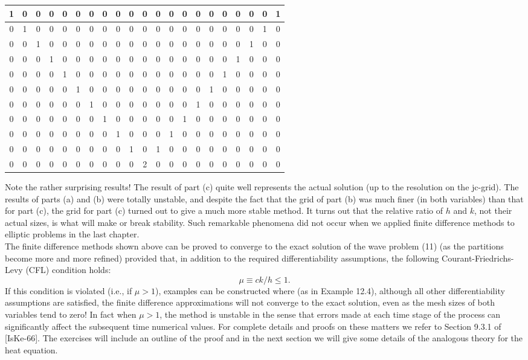 \documentclass[../main.tex]{subfiles}
\begin{document}
\begin{table}[!ht]
    \centering
    \begin{tabular}{|c|c|c|c|c|c|c|c|c|c|c|c|c|c|c|c|c|c|c|c|c|}
    \hline
       1&0&0&0&0&0&0&0&0&0&0&0&0&0&0&0&0&0&0&0&1\\ \hline
       0&1&0&0&0&0&0&0&0&0&0&0&0&0&0&0&0&0&0&1&0\\ \hline
       0&0&1&0&0&0&0&0&0&0&0&0&0&0&0&0&0&0&1&0&0\\ \hline
       0&0&0&1&0&0&0&0&0&0&0&0&0&0&0&0&0&1&0&0&0\\ \hline
       0&0&0&0&1&0&0&0&0&0&0&0&0&0&0&0&1&0&0&0&0\\ \hline
       0&0&0&0&0&1&0&0&0&0&0&0&0&0&0&1&0&0&0&0&0\\ \hline
       0&0&0&0&0&0&1&0&0&0&0&0&0&0&1&0&0&0&0&0&0\\ \hline
       0&0&0&0&0&0&0&1&0&0&0&0&0&1&0&0&0&0&0&0&0\\ \hline
       0&0&0&0&0&0&0&0&1&0&0&0&1&0&0&0&0&0&0&0&0\\ \hline
       0&0&0&0&0&0&0&0&0&1&0&1&0&0&0&0&0&0&0&0&0\\ \hline
       0&0&0&0&0&0&0&0&0&0&2&0&0&0&0&0&0&0&0&0&0\\ \hline
    \end{tabular}
\end{table}
Note the rather surprising results! The result of part (c) quite well represents the actual solution (up to the resolution on the jc-grid). The results of parts (a) and (b) were totally unstable, and despite the fact that the grid of part (b) was much finer (in both variables) than that for part (c), the grid for part (c) turned out to give a much more stable method. It turns out that the relative ratio of $h$ and $k$, not their actual sizes, is what will make or break stability. Such remarkable phenomena did not occur when we applied finite difference methods to elliptic problems in the last chapter. 
\\

The finite difference methods shown above can be proved to converge to the 
exact solution of the wave problem (11) (as the partitions become more and more 
refined) provided that, in addition to the required differentiability assumptions, 
the following Courant-Friedrichs-Levy (CFL) condition holds: 
\begin{equation}
	\mu \equiv ck/h\leqslant1.
\end{equation}
If this condition is violated (i.e., if $\mu > 1$), examples can be constructed where (as in Example 12.4), although all other differentiability assumptions are satisfied, the finite difference approximations will not converge to the exact solution, even as the mesh sizes of both variables tend to zero! In fact when $\mu > 1$, the method is unstable in the sense that errors made at each time stage of the process can significantly affect the subsequent time numerical values. For complete details and proofs on these matters we refer to Section 9.3.1 of [IsKe-66]. The exercises will include an outline of the proof and in the next section we will give some 
details of the analogous theory for the heat equation.
\\
\end{document}
